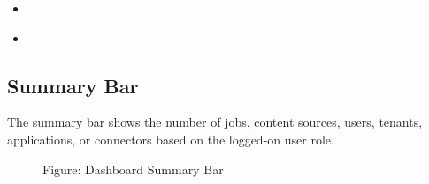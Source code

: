 \documentclass[letterpaper,10pt,english]{sphinxmanual}
\begin{document}
\begin{sphinxShadowBox}
\begin{itemize}
\item {} 
\label{\detokenize{loom_getting_started_guide:id101}}{\hyperref[\detokenize{loom_getting_started_guide:error-messages}]{}}

\item {} 
\label{\detokenize{loom_getting_started_guide:id102}}{\hyperref[\detokenize{loom_getting_started_guide:related-information}]{}}

\end{itemize}
\end{sphinxShadowBox}


\subsection{Summary Bar}
\label{\detokenize{loom_getting_started_guide:summary-bar}}
The summary bar shows the number of jobs, content sources, users, tenants, applications, or connectors based on the logged-on user role.

\begin{figure}[htbp]
\centering
\capstart

\noindent{}
\caption{Figure: Dashboard Summary Bar}\label{\detokenize{loom_getting_started_guide:id19}}\end{figure}
\end{document}
